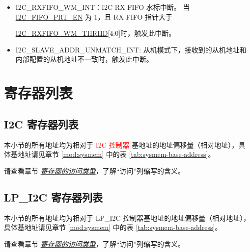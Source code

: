\documentclass[main\_\_CN.tex]{subfiles}
\begin{document}
\begin{itemize}
\hyperref[fielddesc:I2CTXFIFOWMTHRHD]{I2C\_TXFIFO\_WM\_THRHD}[4:0]时，触发此中断。
\item \label{int:i2c-rxfifo-wm}I2C\_RXFIFO\_WM\_INT：I2C RX FIFO 水标中断。 当\hyperref[fielddesc:I2CFIFOPRTEN]{I2C\_FIFO\_PRT\_EN} 为 1，且 RX FIFO 指针大于

\hyperref[fielddesc:I2CRXFIFOWMTHRHD]{I2C\_RXFIFO\_WM\_THRHD}[4:0]时，触发此中断。
\item I2C\_SLAVE\_ADDR\_UNMATCH\_INT: 从机模式下，接收到的从机地址和内部配置的从机地址不一致时，触发此中断。
\end{itemize}



\clearpage
\section{寄存器列表}


\subsection{I2C 寄存器列表}
\label{sec:i2c-reg-summ}
\hypertarget{i2c-reg-summ}{}

本小节的所有地址均为相对于 \textcolor{red}{I2C 控制器} 基地址的地址偏移量（相对地址），具体基地址请见章节 \ref{mod:sysmem} \textit{} 中的表 \ref{tab:sysmem-base-address}。

请查看章节 \hyperref[glossary-access-types]{\textit{寄存器的访问类型}}，了解“访问”列缩写的含义。



\subsection{LP\_I2C 寄存器列表}
\label{sec:lp-i2c-reg-summ}
\hypertarget{lp-i2c-reg-summ}{}

本小节的所有地址均为相对于 LP\_I2C 控制器基地址的地址偏移量（相对地址），具体基地址请见章节 \ref{mod:sysmem} \textit{} 中的表 \ref{tab:sysmem-base-address}。

请查看章节 \hyperref[glossary-access-types]{\textit{寄存器的访问类型}}，了解“访问”列缩写的含义。





\clearpage
\end{document}
